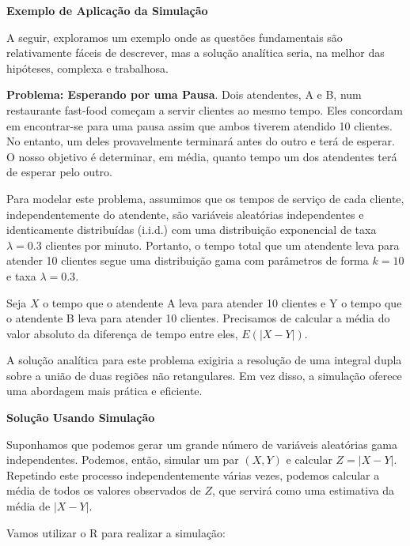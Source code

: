 \documentclass[
]{book}
\begin{document}
\textbf{Exemplo de Aplicação da Simulação}

A seguir, exploramos um exemplo onde as questões fundamentais são
relativamente fáceis de descrever, mas a solução analítica seria, na
melhor das hipóteses, complexa e trabalhosa.

\textbf{Problema: Esperando por uma Pausa}. Dois atendentes, A e B, num
restaurante fast-food começam a servir clientes ao mesmo tempo. Eles
concordam em encontrar-se para uma pausa assim que ambos tiverem
atendido 10 clientes. No entanto, um deles provavelmente terminará antes
do outro e terá de esperar. O nosso objetivo é determinar, em média,
quanto tempo um dos atendentes terá de esperar pelo outro.

Para modelar este problema, assumimos que os tempos de serviço de cada
cliente, independentemente do atendente, são variáveis aleatórias
independentes e identicamente distribuídas (i.i.d.) com uma distribuição
exponencial de taxa \(\lambda = 0.3\) clientes por minuto. Portanto, o
tempo total que um atendente leva para atender 10 clientes segue uma
distribuição gama com parâmetros de forma \(k = 10\) e taxa
\(\lambda = 0.3\).

Seja \(X\) o tempo que o atendente A leva para atender 10 clientes e Y o
tempo que o atendente B leva para atender 10 clientes. Precisamos de
calcular a média do valor absoluto da diferença de tempo entre eles,
\(E(|X - Y|)\).

A solução analítica para este problema exigiria a resolução de uma
integral dupla sobre a união de duas regiões não retangulares. Em vez
disso, a simulação oferece uma abordagem mais prática e eficiente.

\textbf{Solução Usando Simulação}

Suponhamos que podemos gerar um grande número de variáveis aleatórias
gama independentes. Podemos, então, simular um par \((X, Y)\) e calcular
\(Z = |X - Y|\). Repetindo este processo independentemente várias vezes,
podemos calcular a média de todos os valores observados de \(Z\), que
servirá como uma estimativa da média de \(|X - Y|\).

Vamos utilizar o R para realizar a simulação:
\end{document}
